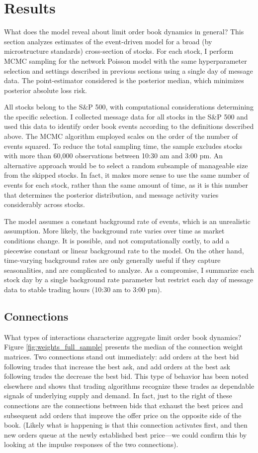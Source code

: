 \section{Results}
What does the model reveal about limit order book dynamics in general? This section analyzes estimates of the event-driven model for a broad (by microstructure standards) cross-section of stocks. For each stock, I perform MCMC sampling for the network Poisson model with the same hyperparameter selection and settings described in previous sections using a single day of message data. The point-estimator considered is the posterior median, which minimizes posterior absolute loss risk.

All stocks belong to the S\&P 500, with computational considerations determining the specific selection. I collected message data for all stocks in the S\&P 500 and used this data to identify order book events according to the definitions described above. The MCMC algorithm employed scales on the order of the number of events squared. To reduce the total sampling time, the sample excludes stocks with more than 60,000 observations between 10:30 am and 3:00 pm. An alternative approach would be to select a random subsample of manageable size from the skipped stocks. In fact, it makes more sense to use the same number of events for each stock, rather than the same amount of time, as it is this number that determines the posterior distribution, and message activity varies considerably across stocks.

The model assumes a constant background rate of events, which is an unrealistic assumption. More likely, the background rate varies over time as market conditions change. It is possible, and not computationally costly, to add a piecewise constant or linear background rate to the model. On the other hand, time-varying background rates are only generally useful if they capture seasonalities, and are complicated to analyze. As a compromise, I summarize each stock day by a single background rate parameter but restrict each day of message data to stable trading hours (10:30 am to 3:00 pm).

\subsection{Connections}
What types of interactions characterize aggregate limit order book dynamics? Figure \ref{fig:weights_full_sample} presents the median of the connection weight matrices. Two connections stand out immediately: add orders at the best bid following trades that increase the best ask, and add orders at the best ask following trades the decrease the best bid. This type of behavior has been noted elsewhere and shows that trading algorithms recognize these trades as dependable signals of underlying supply and demand. In fact, just to the right of these connections are the connections between bids that exhaust the best prices and subsequent add orders that improve the offer price on the opposite side of the book. (Likely what is happening is that this connection activates first, and then new orders queue at the newly established best price—we could confirm this by looking at the impulse responses of the two connections).

